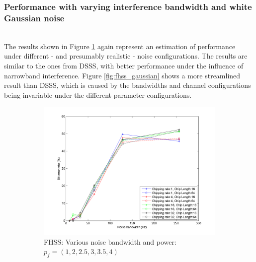 			
		\subsubsection{Performance with varying interference bandwidth and white Gaussian noise}~\\
			The results shown in Figure \ref{fig:fhss_bandwidth} again represent an estimation of performance under different - and presumably realistic - noise configurations.
			The results are similar to the ones from DSSS, with better performance under the influence of narrowband interference.
			Figure \ref{fig:fhss_gaussian} shows a more streamlined result than DSSS, which is caused by the bandwidths and channel configurations being invariable under the different parameter configurations.
	
			\begin{figure}[H]
				\centering
				\caption{}
				\begin{subfigure}[b]{0.5\textwidth}
					\includegraphics[width=\textwidth]{imgs/results/plot_mode_fhss-test_bandwidthAndPower-rep_20-dataRate_8-dataLength_128.png}
					\caption{FHSS: Various noise bandwidth and power: $p_f = (1,2,2.5,3,3.5,4)$}
					\label{fig:fhss_bandwidth}
				\end{subfigure}%
				~
				\begin{subfigure}[b]{0.5\textwidth}

\end{subfigure}
\end{figure}
